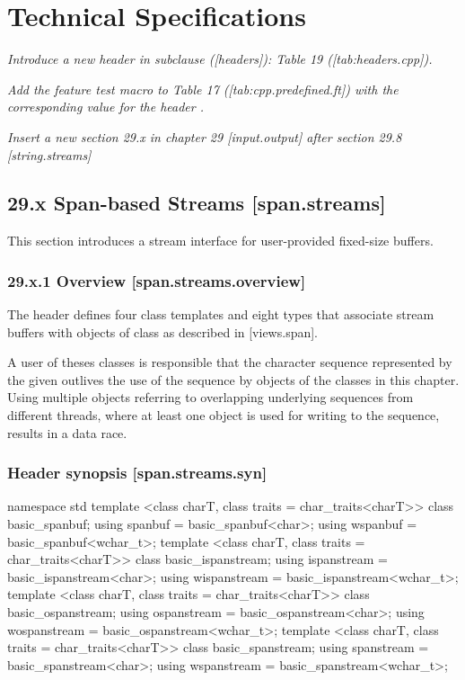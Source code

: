 \documentclass[ebook,11pt,article]{memoir}
\begin{document}
\chapter{Technical Specifications}

\emph{Introduce a new header  in subclause ([headers]): Table 19 ([tab:headers.cpp]).}

\emph{Add the feature test macro  to Table 17 ([tab:cpp.predefined.ft]) with the corresponding value for the header .}

\emph{Insert a new section 29.x in chapter 29 [input.output] after section 29.8 [string.streams]}


\section{29.x Span-based Streams [span.streams]}
This section introduces a stream interface for user-provided fixed-size buffers. 
\subsection{29.x.1 Overview [span.streams.overview]}
The header  defines four class templates and eight types that associate stream buffers with objects of class  as described in [views.span]. 

\begin{note}
A user of theses classes is responsible that the character sequence represented by the given  outlives the use of the sequence by objects of the classes in this chapter. Using multiple  objects referring to overlapping underlying sequences from different threads, where at least one  object is used for writing to the sequence, results in a data race.
\end{note}

\subsection{Header  synopsis [span.streams.syn]}

\begin{codeblock}
namespace std {
  template <class charT, class traits = char_traits<charT>>
    class basic_spanbuf;
  using spanbuf = basic_spanbuf<char>;
  using wspanbuf = basic_spanbuf<wchar_t>;
  template <class charT, class traits = char_traits<charT>>
    class basic_ispanstream;
  using ispanstream = basic_ispanstream<char>;
  using wispanstream = basic_ispanstream<wchar_t>;
  template <class charT, class traits = char_traits<charT>>
    class basic_ospanstream;
  using ospanstream = basic_ospanstream<char>;
  using wospanstream = basic_ospanstream<wchar_t>;
  template <class charT, class traits = char_traits<charT>>
    class basic_spanstream;
  using spanstream = basic_spanstream<char>;
  using wspanstream = basic_spanstream<wchar_t>;
}
\end{codeblock}
\end{document}
